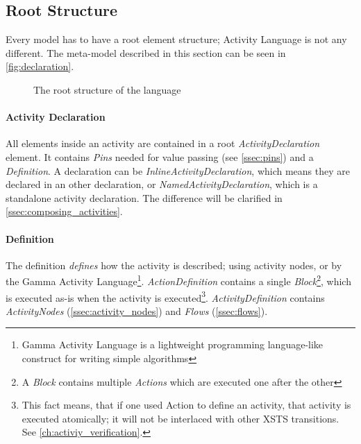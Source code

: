 \subsection{Root Structure}\label{ssec:root_structure}

Every model has to have a root element structure; Activity Language is not any different. The meta-model described in this section can be seen in \autoref{fig:declaration}.

\begin{figure}[!ht]
	\centering
	
	\caption{The root structure of the language}
	\label{fig:declaration}
\end{figure}

\paragraph{Activity Declaration}\label{par:activity_declaration}

All elements inside an activity are contained in a root \emph{ActivityDeclaration} element. It contains \emph{Pins} needed for value passing (see \autoref{ssec:pins}) and a \emph{Definition}. A declaration can be \emph{InlineActivityDeclaration}, which means they are declared in an other declaration, or \emph{NamedActivityDeclaration}, which is a standalone activity declaration. The difference will be clarified in \autoref{ssec:composing_activities}.

\paragraph{Definition}\label{par:definition}

The definition \emph{defines} how the activity is described; using activity nodes, or by the Gamma Activity Language\footnote{Gamma Activity Language is a lightweight programming language-like construct for writing simple algorithms}. \emph{ActionDefinition} contains a single \emph{Block}\footnote{A \emph{Block} contains multiple \emph{Actions} which are executed one after the other}, which is executed as-is when the activity is executed\footnote{This fact means, that if one used Action to define an activity, that activity is executed atomically; it will not be interlaced with other XSTS transitions. See \autoref{ch:activiy_verification}.}. \emph{ActivityDefinition} contains \emph{ActivityNodes} (\autoref{ssec:activity_nodes}) and \emph{Flows} (\autoref{ssec:flows}).

